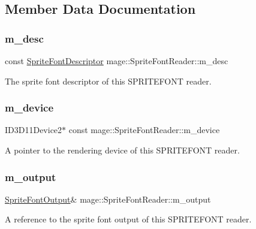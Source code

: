 \subsection{Member Data Documentation}
\hypertarget{classmage_1_1_sprite_font_reader_a577e1a05126b5b8d7bbdaa3e83bf32bf}{}\label{classmage_1_1_sprite_font_reader_a577e1a05126b5b8d7bbdaa3e83bf32bf} 
\subsubsection{\texorpdfstring{m\+\_\+desc}{m\_desc}}
{\footnotesize\ttfamily const \hyperlink{structmage_1_1_sprite_font_descriptor}{Sprite\+Font\+Descriptor} mage\+::\+Sprite\+Font\+Reader\+::m\+\_\+desc\hspace{0.3cm}{\ttfamily [private]}}

The sprite font descriptor of this S\+P\+R\+I\+T\+E\+F\+O\+NT reader. \hypertarget{classmage_1_1_sprite_font_reader_aa77ee2a35b9ad15d5c1abfc6ffe5810c}{}\label{classmage_1_1_sprite_font_reader_aa77ee2a35b9ad15d5c1abfc6ffe5810c} 
\subsubsection{\texorpdfstring{m\+\_\+device}{m\_device}}
{\footnotesize\ttfamily I\+D3\+D11\+Device2$\ast$ const mage\+::\+Sprite\+Font\+Reader\+::m\+\_\+device\hspace{0.3cm}{\ttfamily [private]}}

A pointer to the rendering device of this S\+P\+R\+I\+T\+E\+F\+O\+NT reader. \hypertarget{classmage_1_1_sprite_font_reader_a3df62ce71f85745c493b142c726261b3}{}\label{classmage_1_1_sprite_font_reader_a3df62ce71f85745c493b142c726261b3} 
\subsubsection{\texorpdfstring{m\+\_\+output}{m\_output}}
{\footnotesize\ttfamily \hyperlink{structmage_1_1_sprite_font_output}{Sprite\+Font\+Output}\& mage\+::\+Sprite\+Font\+Reader\+::m\+\_\+output\hspace{0.3cm}{\ttfamily [private]}}

A reference to the sprite font output of this S\+P\+R\+I\+T\+E\+F\+O\+NT reader. 